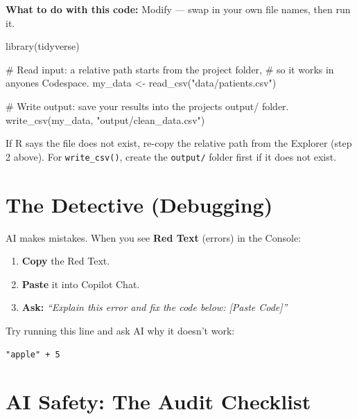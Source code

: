 \documentclass[
  letterpaper,
  DIV=11,
  numbers=noendperiod,
  oneside]{scrreprt}
\newenvironment{Shaded}{\begin{snugshade}}{\end{snugshade}}
\newcommand{\CommentTok}[1]{\textcolor[rgb]{0.37,0.37,0.37}{#1}}
\newcommand{\FunctionTok}[1]{\textcolor[rgb]{0.28,0.35,0.67}{#1}}
\newcommand{\NormalTok}[1]{\textcolor[rgb]{0.00,0.23,0.31}{#1}}
\newcommand{\OtherTok}[1]{\textcolor[rgb]{0.00,0.23,0.31}{#1}}
\newcommand{\StringTok}[1]{\textcolor[rgb]{0.13,0.47,0.30}{#1}}
\begin{document}
\textbf{What to do with this code:} Modify --- swap in your own file
names, then run it.

\begin{Shaded}
\begin{Highlighting}[numbers=left,,]
\FunctionTok{library}\NormalTok{(tidyverse)}

\CommentTok{\# Read input: a relative path starts from the project folder,}
\CommentTok{\# so it works in anyone\textquotesingle{}s Codespace.}
\NormalTok{my\_data }\OtherTok{\textless{}{-}} \FunctionTok{read\_csv}\NormalTok{(}\StringTok{"data/patients.csv"}\NormalTok{)}

\CommentTok{\# Write output: save your results into the project\textquotesingle{}s output/ folder.}
\FunctionTok{write\_csv}\NormalTok{(my\_data, }\StringTok{"output/clean\_data.csv"}\NormalTok{)}
\end{Highlighting}
\end{Shaded}

If R says the file does not exist, re-copy the relative path from the
Explorer (step 2 above). For \texttt{write\_csv()}, create the
\texttt{output/} folder first if it does not exist.

\chapter{The Detective (Debugging)}\label{the-detective-debugging}

AI makes mistakes. When you see \textbf{Red Text} (errors) in the
Console:

\begin{enumerate}
\def\labelenumi{\arabic{enumi}.}
\item
  \textbf{Copy} the Red Text.
\item
  \textbf{Paste} it into Copilot Chat.
\item
  \textbf{Ask:} \emph{``Explain this error and fix the code below:
  {[}Paste Code{]}''}
\end{enumerate}

Try running this line and ask AI why it doesn't work:

\begin{verbatim}
"apple" + 5
\end{verbatim}

\chapter{AI Safety: The Audit
Checklist}\label{ai-safety-the-audit-checklist-1}
\end{document}
